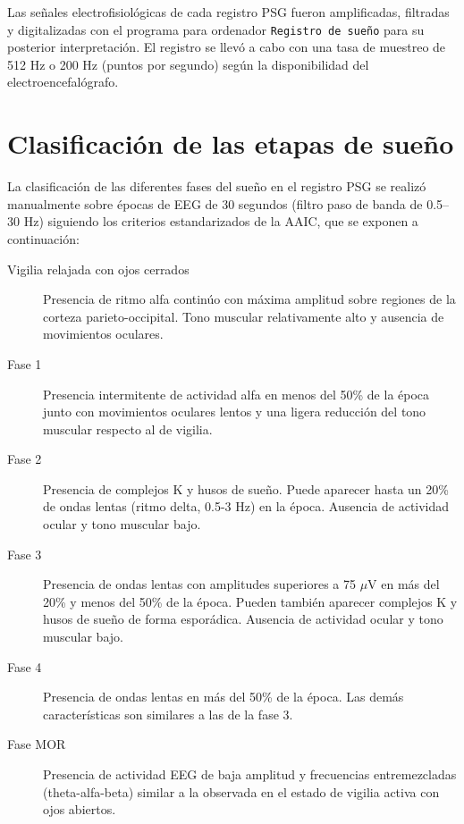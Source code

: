 Las se\~nales electrofisiol\'ogicas de cada registro PSG fueron amplificadas, filtradas y 
digitalizadas con el programa para ordenador \texttt{Registro de sue\~no} 
para su posterior interpretaci\'on. 
El registro se llev\'o a cabo con una tasa de muestreo de 512 Hz o 200 Hz (puntos por segundo)
seg\'un la disponibilidad del electroencefal\'ografo.


\section{Clasificaci\'on de las etapas de sue\~no}

La clasificaci\'on de las diferentes fases del sue\~no en el registro PSG se realiz\'o manualmente 
sobre \'epocas de EEG de 30 segundos (filtro paso de banda de 0.5--30 Hz) siguiendo los criterios 
estandarizados de la AAIC\cite{Hori01}, que se exponen a continuación:
\begin{description}
\item[Vigilia relajada con ojos cerrados] Presencia de ritmo alfa contin\'uo con m\'axima amplitud 
sobre regiones de la corteza parieto-occipital. Tono muscular relativamente alto y ausencia de 
movimientos oculares.

\item[Fase 1] %
Presencia intermitente de 
actividad alfa en menos del 50\% de la \'epoca junto con movimientos oculares lentos y una ligera 
reducci\'on del tono muscular respecto al de vigilia.

\item[Fase 2] Presencia de complejos K y husos de sue\~no. Puede aparecer hasta un 20\% de ondas 
lentas (ritmo delta, 0.5-3 Hz) en la \'epoca. Ausencia de actividad ocular y tono muscular bajo.

\item[Fase 3] Presencia de ondas lentas con amplitudes superiores a 75 $\mu$V en m\'as del
20\% y menos del 50\% de la \'epoca. Pueden tambi\'en aparecer complejos K y husos de sue\~no de 
forma espor\'adica. Ausencia de actividad ocular y tono muscular bajo.

\item[Fase 4] Presencia de ondas lentas en m\'as del 50\% de la época. Las dem\'as 
caracter\'isticas son similares a las de la fase 3.

\item[Fase MOR] Presencia de actividad EEG de baja amplitud y frecuencias entremezcladas 
(theta-alfa-beta) similar a la observada en el estado de vigilia activa con ojos abiertos.
\end{description}


